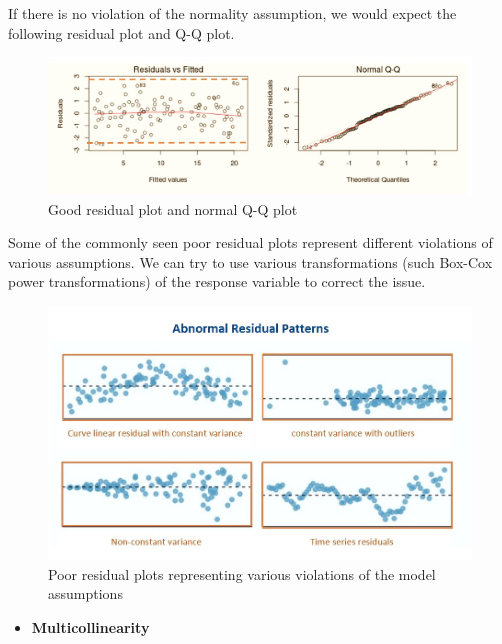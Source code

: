 \documentclass[
]{book}
\providecommand{\tightlist}{%
  \setlength{\itemsep}{0pt}\setlength{\parskip}{0pt}}
\begin{document}
If there is no violation of the normality assumption, we would expect the following residual plot and Q-Q plot.

\begin{figure}[!ht]

{\centering \includegraphics[width=16.17in,]{img04/w04-GoodResidualPlots} 

}

\caption{Good residual plot and normal Q-Q plot}\label{fig:w10-GoodResidualPlot}
\end{figure}

Some of the commonly seen poor residual plots represent different violations of various assumptions. We can try to use various transformations (such Box-Cox power transformations) of the response variable to correct the issue.

\begin{figure}[!ht]

{\centering \includegraphics[width=12.79in,]{img04/w04-BadResidualPlots} 

}

\caption{Poor residual plots representing various violations of the model assumptions}\label{fig:w10-BadResidualPlots}
\end{figure}

\begin{itemize}
\tightlist
\item
  \textbf{Multicollinearity}
\end{itemize}
\end{document}

